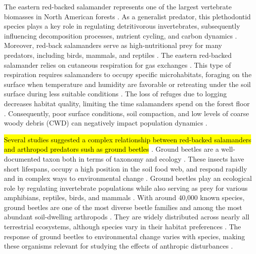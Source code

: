 The eastern red-backed salamander represents one of the largest vertebrate biomasses in North American forests \citep{Burton1975Salamanderpopulations,Petranka1993Effectstimber,semlitschAbundanceBiomassProduction2014a}. 
As a generalist predator, this plethodontid species plays a key role in regulating detritivorous invertebrates, subsequently influencing decomposition processes, nutrient cycling, and carbon dynamics \citep{Burton1975Energyflow,Wyman1998Experimentalassessment,Walton2013Topdownregulation,Hickerson2017Easternredbacked}. 
Moreover, red-back salamanders serve as high-nutritional prey for many predators, including birds, mammals, and reptiles \citep{Burton1975Energyflow,Pough1987abundancesalamanders}. 
The eastern red-backed salamander relies on cutaneous respiration for gas exchanges \citep{Heatwole1961Relationsubstrate}. 
This type of respiration requires salamanders to occupy specific microhabitats, foraging on the surface when temperature and humidity are favorable or retreating under the soil surface during less suitable conditions \citep{Grizzell1949HibernationSite,FraserEmpiricalEvaluation1976,Jaeger1980MicrohabitatsTerrestrial}. 
The loss of refuges due to logging decreases habitat quality, limiting the time salamanders spend on the forest floor \citep{Achat2015Quantifyingconsequences,Peele2017Effectswoody}. 
Consequently, poor surface conditions, soil compaction, and low levels of coarse woody debris (CWD) can negatively impact population dynamics \citep{Peterman2014Spatialvariation}. 

\hl{Several studies suggested a complex relationship between red-backed salamanders and arthropod predators sush as ground beetles} \citep{Gall2003BehavioralInteractions,Walton2006Salamandersforestfloor,Hickerson2018Behavioralinteractions}. 
Ground beetles are a well-documented taxon both in terms of taxonomy and ecology \citep{loveiEcologyBehaviorGround1996}. 
These insects have short lifespans, occupy a high position in the soil food web, and respond rapidly and in complex ways to environmental change \citep{loveiEcologyBehaviorGround1996}. 
Ground beetles play an ecological role by regulating invertebrate populations while also serving as prey for various amphibians, reptiles, birds, and mammals \citep{loveiEcologyBehaviorGround1996}. 
With around 40,000 known species, ground beetles are one of the most diverse beetle families and among the most abundant soil-dwelling arthropods \citep{Erwin1985taxonpulse,loveiEcologyBehaviorGround1996,Rochefort2006GroundBeetle}. 
They are widely distributed across nearly all terrestrial ecosystems, although species vary in their habitat preferences \citep{loveiEcologyBehaviorGround1996,kotzeFortyYearsCarabid2011a,Larochelle2003naturalhistory}. 
The response of ground beetles to environmental change varies with species, making these organisms relevant for studying the effects of anthropic disturbances \citep{Rainio2003Groundbeetles}. 


